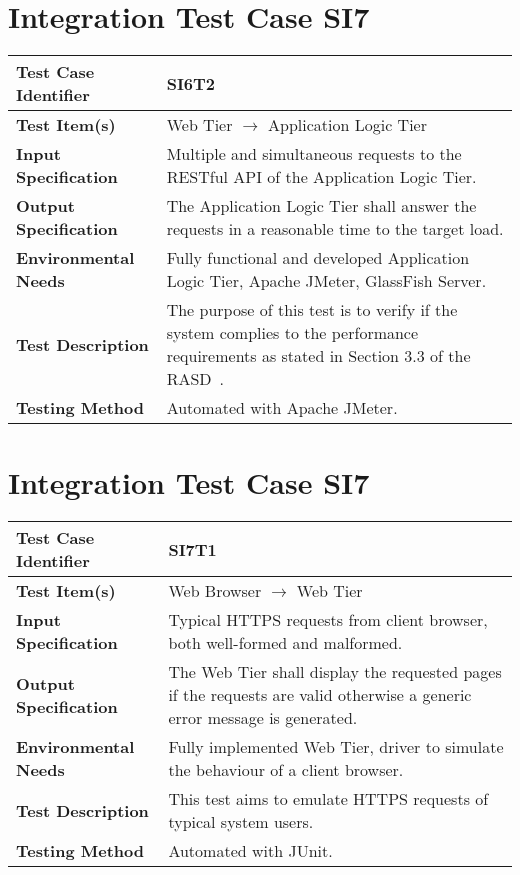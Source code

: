 \section{Integration Test Case SI7}


\begin{longtable}{p{} | p{}}
\hline
\textbf{Test Case Identifier} & SI6T2\\
\hline
\textbf{Test Item(s)} & Web Tier $\rightarrow$ Application Logic Tier \\
\hline
\textbf{Input Specification} & Multiple and simultaneous requests to the RESTful API of the Application Logic Tier. \\
\hline
\textbf{Output Specification} & The Application Logic Tier shall answer the requests in a reasonable time to the target load. \\
\hline
\textbf{Environmental Needs} & Fully functional and developed Application Logic Tier, Apache JMeter, GlassFish Server. \\
\hline
\textbf{Test Description} & The purpose of this test is to verify if the system complies to the performance requirements as stated in Section 3.3 of the RASD~\cite{rasd}. \\
\hline
\textbf{Testing Method} & Automated with Apache JMeter. \\
\hline
\end{longtable}

\section{Integration Test Case SI7}

\begin{longtable}{p{} | p{}}
\hline
\textbf{Test Case Identifier} & SI7T1\\
\hline
\textbf{Test Item(s)} & Web Browser $\rightarrow$ Web Tier \\
\hline
\textbf{Input Specification} & Typical HTTPS requests from client browser, both well-formed and malformed. \\
\hline
\textbf{Output Specification} & The Web Tier shall display the requested pages if the requests are valid otherwise a generic error message is generated. \\
\hline
\textbf{Environmental Needs} & Fully implemented Web Tier, driver to simulate the behaviour of a client browser. \\
\hline
\textbf{Test Description} & This test aims to emulate HTTPS requests of typical system users. \\
\hline
\textbf{Testing Method} & Automated with JUnit. \\
\hline
\end{longtable}

